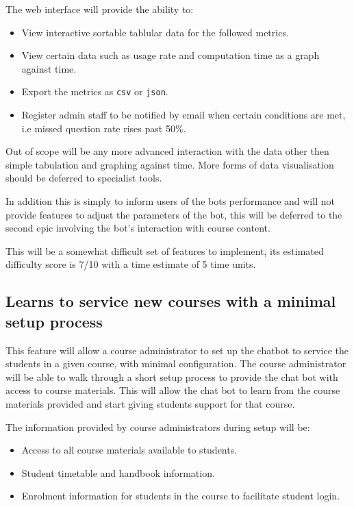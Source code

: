 \documentclass{article}
\begin{document}
The web interface will provide the ability to:
\begin{itemize}
  \item View interactive sortable tablular data for the followed metrics.
  \item View certain data such as usage rate and computation time as a graph against time.
  \item Export the metrics as \texttt{csv} or \texttt{json}.
  \item Register admin staff to be notified by email when certain conditions are met, i.e missed question rate rises past 50\%.
\end{itemize}

Out of scope will be any more advanced interaction with the data other then simple tabulation and graphing against time. More forms of data visualisation should be deferred to specialist tools. 

In addition this is simply to inform users of the bots performance and will not provide features to adjust the parameters of the bot, this will be deferred to the second epic involving the bot's interaction with course content. 

This will be a somewhat difficult set of features to implement, its estimated difficulty score is 7/10 with a time estimate of 5 time units.

\subsection{Learns to service new courses with a minimal setup process}

This feature will allow a course administrator to set up the chatbot to service the students in a given course, with minimal configuration.
The course administrator will be able to walk through a short setup process to provide the chat bot with access to course materials.
This will allow the chat bot to learn from the course materials provided and start giving students support for that course. 

The information provided by course administrators during setup will be:
\begin{itemize}
  \item Access to all course materials available to students.
  \item Student timetable and handbook information.
  \item Enrolment information for students in the course to facilitate student login.
\end{itemize}
\end{document}
